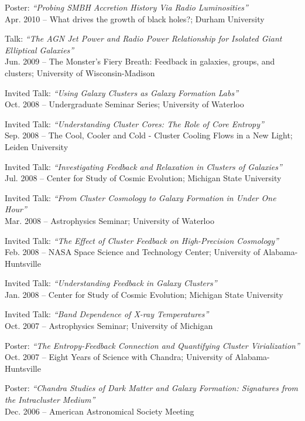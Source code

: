 \documentclass[12pt]{cv}
\begin{document}
\begin{llist}
{\sc Poster: {\textit{``Probing SMBH Accretion History Via Radio Luminosities''}}}\\
Apr. 2010 -- What drives the growth of black holes?; Durham University

{\sc Talk: {\textit{``The AGN Jet Power and Radio Power Relationship for Isolated Giant Elliptical Galaxies''}}}\\
Jun. 2009 -- The Monster's Fiery Breath: Feedback in galaxies, groups, and clusters; University of Wisconsin-Madison

{\sc Invited Talk: {\textit{``Using Galaxy Clusters as Galaxy Formation Labs''}}}\\
Oct. 2008 -- Undergraduate Seminar Series; University of Waterloo

{\sc Invited Talk: {\textit{``Understanding Cluster Cores: The Role of Core Entropy''}}}\\
Sep. 2008 -- The Cool, Cooler and Cold - Cluster Cooling Flows in a New Light; Leiden University

{\sc Invited Talk: {\textit{``Investigating Feedback and Relaxation in Clusters of Galaxies''}}}\\
Jul. 2008 -- Center for Study of Cosmic Evolution; Michigan State University

{\sc Invited Talk: {\textit{``From Cluster Cosmology to Galaxy Formation in Under One Hour''}}}\\
Mar. 2008 -- Astrophysics Seminar; University of Waterloo

{\sc Invited Talk: {\textit{``The Effect of Cluster Feedback on High-Precision Cosmology''}}}\\
Feb. 2008 -- NASA Space Science and Technology Center; University of Alabama-Huntsville

{\sc Invited Talk: {\textit{``Understanding Feedback in Galaxy Clusters''}}}\\
Jan. 2008 -- Center for Study of Cosmic Evolution; Michigan State University

{\sc Invited Talk: {\textit{``Band Dependence of X-ray Temperatures''}}}\\
Oct. 2007 -- Astrophysics Seminar; University of Michigan

{\sc Poster: {\textit{``The Entropy-Feedback Connection and Quantifying Cluster Virialization''}}}\\
Oct. 2007 -- Eight Years of Science with Chandra; University of Alabama-Huntsville

{\sc Poster: {\textit{``Chandra Studies of Dark Matter and Galaxy Formation: Signatures from the Intracluster Medium''}}}\\
Dec. 2006 -- American Astronomical Society Meeting


\end{llist}
\end{document}
